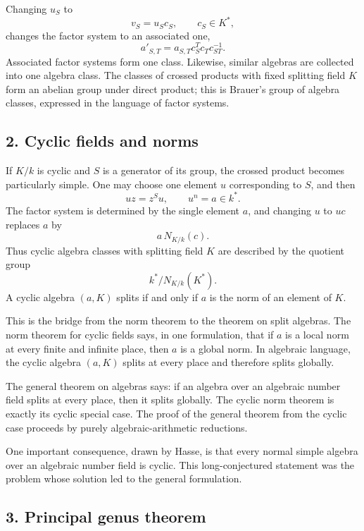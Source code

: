 \documentclass[
  11pt,
]{article}
\begin{document}
Changing \(u_S\) to \[
  v_S=u_Sc_S,
  \qquad c_S\in K^*,
\] changes the factor system to an associated one, \[
  a'_{S,T}=a_{S,T}c_S^T c_T c_{ST}^{-1}.
\] Associated factor systems form one class. Likewise, similar algebras
are collected into one algebra class. The classes of crossed products
with fixed splitting field \(K\) form an abelian group under direct
product; this is Brauer's group of algebra classes, expressed in the
language of factor systems.

\subsection{2. Cyclic fields and norms}\label{cyclic-fields-and-norms}

If \(K/k\) is cyclic and \(S\) is a generator of its group, the crossed
product becomes particularly simple. One may choose one element \(u\)
corresponding to \(S\), and then \[
  uz=z^S u,
  \qquad
  u^n=a\in k^*.
\] The factor system is determined by the single element \(a\), and
changing \(u\) to \(uc\) replaces \(a\) by \[
  a\,N_{K/k}(c).
\] Thus cyclic algebra classes with splitting field \(K\) are described
by the quotient group \[
  k^*/N_{K/k}(K^*).
\] A cyclic algebra \((a,K)\) splits if and only if \(a\) is the norm of
an element of \(K\).

This is the bridge from the norm theorem to the theorem on split
algebras. The norm theorem for cyclic fields says, in one formulation,
that if \(a\) is a local norm at every finite and infinite place, then
\(a\) is a global norm. In algebraic language, the cyclic algebra
\((a,K)\) splits at every place and therefore splits globally.

The general theorem on algebras says: if an algebra over an algebraic
number field splits at every place, then it splits globally. The cyclic
norm theorem is exactly its cyclic special case. The proof of the
general theorem from the cyclic case proceeds by purely
algebraic-arithmetic reductions.

One important consequence, drawn by Hasse, is that every normal simple
algebra over an algebraic number field is cyclic. This long-conjectured
statement was the problem whose solution led to the general formulation.

\subsection{3. Principal genus theorem}\label{principal-genus-theorem}
\end{document}
